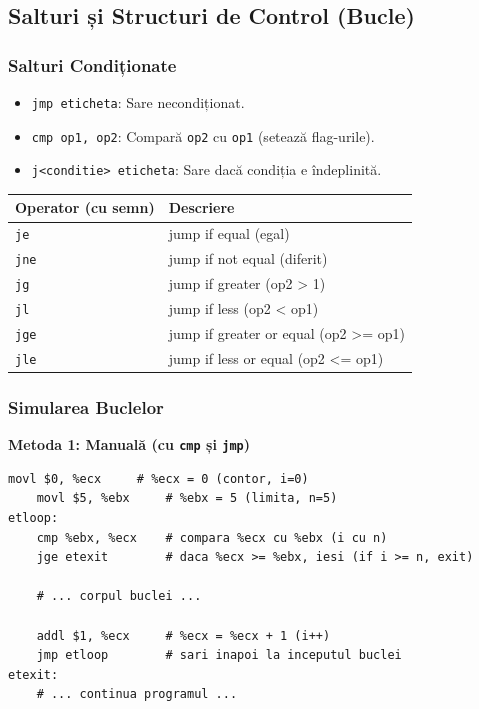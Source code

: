 \documentclass[12pt,a4paper]{article}
\begin{document}
\subsection{Salturi și Structuri de Control (Bucle)}

\subsubsection{Salturi Condiționate}
\begin{itemize}
    \item \texttt{jmp eticheta}: Sare necondiționat.
    \item \texttt{cmp op1, op2}: Compară \texttt{op2} cu \texttt{op1} (setează flag-urile).
    \item \texttt{j<conditie> eticheta}: Sare dacă condiția e îndeplinită.
\end{itemize}

\begin{table}[ht!]
\centering
\begin{tabular}{ll}
\toprule
\textbf{Operator (cu semn)} & \textbf{Descriere} \\
\midrule
\texttt{je} & jump if equal (egal) \\
\texttt{jne} & jump if not equal (diferit) \\
\texttt{jg} & jump if greater (op2 > 1) \\
\texttt{jl} & jump if less (op2 < op1) \\
\texttt{jge} & jump if greater or equal (op2 >= op1) \\
\texttt{jle} & jump if less or equal (op2 <= op1) \\
\bottomrule
\end{tabular}
\end{table}

\subsubsection{Simularea Buclelor}

\textbf{Metoda 1: Manuală (cu \texttt{cmp} și \texttt{jmp})}
\begin{lstlisting}[language=x86asm]
    movl $0, %ecx     # %ecx = 0 (contor, i=0)
    movl $5, %ebx     # %ebx = 5 (limita, n=5)
etloop:
    cmp %ebx, %ecx    # compara %ecx cu %ebx (i cu n)
    jge etexit        # daca %ecx >= %ebx, iesi (if i >= n, exit)
    
    # ... corpul buclei ...
    
    addl $1, %ecx     # %ecx = %ecx + 1 (i++)
    jmp etloop        # sari inapoi la inceputul buclei
etexit:
    # ... continua programul ...
\end{lstlisting}
\end{document}
